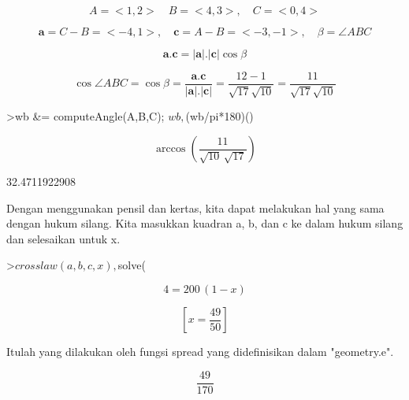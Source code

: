 \documentclass[12pt,arial,letterpaper]{book}
\begin{document}
\begin{eulernootebook}
\begin{eulercomment}
\begin{eulercomment}
\begin{eulernootebook}
\begin{eulercomment}
\begin{eulercomment}
\begin{eulercomment}
\begin{eulercomment}
\begin{eulercomment}
\begin{eulercomment}
\begin{eulernotebook}
\begin{eulercomment}
\begin{eulercomment}
\begin{eulercomment}
\begin{eulercomment}
\begin{eulercomment}
\end{eulercomment}
\begin{eulerformula}
\[
A=<1,2>\quad B=<4,3>,\quad C=<0,4>
\]
\end{eulerformula}
\begin{eulerformula}
\[
\mathbf{a}=C-B=<-4,1>,\quad \mathbf{c}=A-B=<-3,-1>,\quad \beta=\angle ABC
\]
\end{eulerformula}
\begin{eulerformula}
\[
\mathbf{a}.\mathbf{c}=|\mathbf{a}|.|\mathbf{c}|\cos \beta
\]
\end{eulerformula}
\begin{eulerformula}
\[
\cos \angle ABC =\cos\beta=\frac{\mathbf{a}.\mathbf{c}}{|\mathbf{a}|.|\mathbf{c}|}=\frac{12-1}{\sqrt{17}\sqrt{10}}=\frac{11}{\sqrt{17}\sqrt{10}}
\]
\end{eulerformula}
\begin{eulerprompt}
>wb &= computeAngle(A,B,C); $wb, $(wb/pi*180)()
\end{eulerprompt}
\begin{eulerformula}
\[
\arccos \left(\frac{11}{\sqrt{10}\,\sqrt{17}}\right)
\]
\end{eulerformula}
\begin{euleroutput}
  32.4711922908
\end{euleroutput}
\begin{eulercomment}
Dengan menggunakan pensil dan kertas, kita dapat melakukan hal yang
sama dengan hukum silang. Kita masukkan kuadran a, b, dan c ke dalam
hukum silang dan selesaikan untuk x.
\end{eulercomment}
\begin{eulerprompt}
>$crosslaw(a,b,c,x), $solve(%
\end{eulerprompt}
\begin{eulerformula}
\[
4=200\,\left(1-x\right)
\]
\end{eulerformula}
\begin{eulerformula}
\[
\left[ x=\frac{49}{50} \right] 
\]
\end{eulerformula}
\begin{eulercomment}
Itulah yang dilakukan oleh fungsi spread yang didefinisikan dalam
"geometry.e".
\end{eulercomment}
\begin{eulerformula}
\[
\frac{49}{170}
\]
\end{eulerformula}

\end{eulercomment}
\end{eulercomment}
\end{eulercomment}
\end{eulercomment}
\end{eulernotebook}
\end{eulercomment}
\end{eulercomment}
\end{eulercomment}
\end{eulercomment}
\end{eulercomment}
\end{eulercomment}
\end{eulernootebook}
\end{eulercomment}
\end{eulercomment}
\end{eulernootebook}
\end{document}
